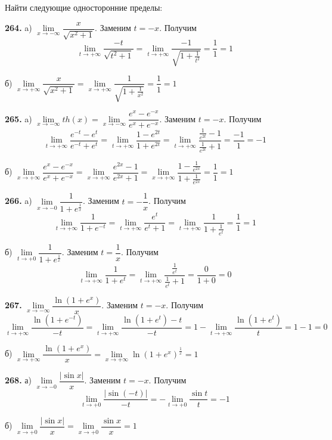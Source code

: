 \documentclass[12pt]{article}
\begin{document}
	\bigskip
	Найти следующие односторонние пределы:
	
	\medskip
	{\bf 264.} a) $\lim\limits_{x\to-\infty}\dfrac{x}{\sqrt{x^2+1}}$. Заменим $t=-x$. Получим
	\[
		\lim\limits_{t\to+\infty} \dfrac{-t}{\sqrt{t^2+1}} = \lim\limits_{t\to+\infty} \dfrac{-1}{\sqrt{1+\frac{1}{t^2}}} = \dfrac{1}{1}=1
	\]
	
	\medskip
	б) $\lim\limits_{x\to+\infty}\dfrac{x}{\sqrt{x^2+1}} = \lim\limits_{x\to+\infty} \dfrac{1}{\sqrt{1+\frac{1}{x^2}}} = \dfrac{1}{1} = 1$
	
	\medskip
	{\bf 265.} a) $\lim\limits_{x\to-\infty} th(x) = \lim\limits_{x\to-\infty} \dfrac{e^x-e^{-x}}{e^x+e^{-x}}$. Заменим $t=-x$. Получим
	\[
	\lim\limits_{t\to+\infty}\dfrac{e^{-t}-e^t}{e^{-t}+e^t} = \lim\limits_{t\to+\infty} \dfrac{1-e^{2t}}{1+e^{2t}} = \lim\limits_{t\to+\infty} \dfrac{\frac{1}{e^{2t}}-1}{\frac{1}{e^{2t}}+1} = \dfrac{-1}{1}=-1
	\]
	
	\medskip
	б) $\lim\limits_{x\to+\infty}\dfrac{e^{x}-e^{-x}}{e^x+e^{-x}} = \lim\limits_{x\to+\infty} \dfrac{e^{2x}-1}{e^{2x}+1} = \lim\limits_{x\to+\infty} \dfrac{1-\frac{1}{e^{2x}}}{1+\frac{1}{e^{2x}}} = \dfrac{1}{1} = 1$
	
	
	\medskip
	{\bf 266.} a)  $\lim\limits_{x\to-0}\dfrac{1}{1+e^{\frac{1}{x}}} $. Заменим $t=-\dfrac{1}{x}$. Получим
	\[
		\lim\limits_{t\to+\infty}\dfrac{1}{1+e^{-t}} = \lim\limits_{t\to+\infty} \dfrac{e^t}{e^t+1} = \lim\limits_{t\to+\infty} \dfrac{1}{1+\frac{1}{e^t}} = \dfrac{1}{1} = 1
	\]
	
	\medskip
	б) $\lim\limits_{t\to+0} \dfrac{1}{1+e^{\frac{1}{x}}}$. Заменим $t=\dfrac{1}{x}$. Получим
	\[
		\lim\limits_{t\to+\infty} \dfrac{1}{1+e^t} = \lim\limits_{t\to+\infty} \dfrac{\frac{1}{e^t}}{\frac{1}{e^t}+1} = \dfrac{0}{1+0} = 0
	\]
	
	\medskip
	{\bf 267.} $\lim\limits_{x\to-\infty} \dfrac{\ln(1+e^x)}{x}$. Заменим $t=-x$. Получим
	\[
		\lim\limits_{t\to+\infty} \dfrac{\ln(1+e^{-t})}{-t} = \lim\limits_{t\to+\infty} \dfrac{\ln(1+e^t)-t}{-t} = 1-\lim\limits_{t\to+\infty} \dfrac{\ln(1+e^t)}{t} = 1-1=0
	\]
	
	\medskip
	б) $\lim\limits_{x\to+\infty} \dfrac{\ln(1+e^x)}{x} = \lim\limits_{x\to+\infty}\ln(1+e^x)^\frac{1}{x} = 1$
	
	\medskip
	{\bf 268.} а) $\lim\limits_{x\to-0}\dfrac{|\sin x|}{x}$. Заменим $t=-x$. Получим
	\[
		\lim\limits_{t\to+0} \dfrac{|\sin(-t)|}{-t} = -\lim\limits_{t\to+0}\dfrac{\sin t}{t} = -1
	\]
	
	\medskip
	б) $\lim\limits_{x\to+0}\dfrac{|\sin x|}{x} = \lim\limits_{x\to+0} \dfrac{\sin x}{x} = 1$
	
\end{document}

